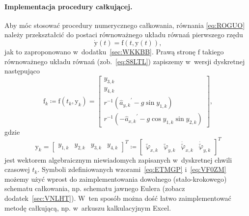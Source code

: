 \documentclass[paper=a4,DIV=12]{lpas}
\newcommand{\brm}[1]{\bm{\mathrm{#1}}}
\begin{document}
\paragraph{Implementacja procedury całkującej.}
Aby móc stosować procedury numerycznego całkowania, równania \eqref{eq:ROGUO}
należy przekształcić do postaci równoważnego układu równań pierwszego rzędu
\begin{equation}
  \dot{\brm{y}}\left(t\right) = \brm{f}\left(t,\brm{y}\left(t\right)\right),
  \label{eq:DOHJE}
\end{equation}
jak to zaproponowano w~dodatku~\ref{sec:WKKBB}. Prawą stronę $\brm{f}$
takiego równoważnego układu równań (zob.~\eqref{eq:S8LTL}) zapiszemy w~wersji
dyskretnej następująco
\begin{equation}
  \brm{f}_k \coloneqq \brm{f}\left(t_k, \brm{y}_k\right) = \begin{bmatrix}
    y_{3,k} \\
    y_{4,k} \\
    r^{-1} \left( {\hat{a}_{y,k}}^{\prime} - g \sin{y_{1,k}} \right)  \\
    r^{-1} \left(-{\hat{a}_{x,k}}^{\prime} - g \cos{y_{1,k}}\sin{y_{2,k}} \right)
  \end{bmatrix},
  \label{eq:ETMGP}
\end{equation}
gdzie
\begin{equation}
  \brm{y}_k = \begin{bmatrix}
    y_{1,k} & y_{2,k} & y_{3,k} & y_{4,k}
  \end{bmatrix}^T \coloneqq \begin{bmatrix}
    \widetilde{\varphi}_{x,k} &
    \widetilde{\varphi}_{y,k} &
    \dot{\widetilde{\varphi}}_{x,k} &
    \dot{\widetilde{\varphi}}_{y,k}
  \end{bmatrix}^T
  \label{eq:VF0ZM}
\end{equation}
jest wektorem algebraicznym niewiadomych zapisanych w~dyskretnej chwili
czasowej $t_k$. Symboli zdefiniowanych wzorami~\eqref{eq:ETMGP}
i~\eqref{eq:VF0ZM} możemy użyć wprost do zaimplementowania dowolnego
(stało-krokowego) schematu całkowania, np. schematu jawnego Eulera (zobacz
dodatek~\ref{sec:VNLHT}). W~ten sposób można dość łatwo zaimplementować metodę
całkującą, np. w~arkuszu kalkulacyjnym Excel.
\end{document}
